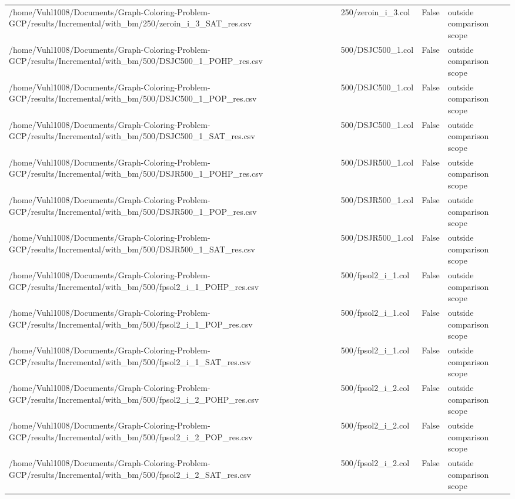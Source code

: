 \begin{table}[htbp]
\begin{tabular}{llll}
/home/Vuhl1008/Documents/Graph-Coloring-Problem-GCP/results/Incremental/with\_bm/250/zeroin\_i\_3\_SAT\_res.csv & 250/zeroin\_i\_3.col & False & outside comparison scope \\
/home/Vuhl1008/Documents/Graph-Coloring-Problem-GCP/results/Incremental/with\_bm/500/DSJC500\_1\_POHP\_res.csv & 500/DSJC500\_1.col & False & outside comparison scope \\
/home/Vuhl1008/Documents/Graph-Coloring-Problem-GCP/results/Incremental/with\_bm/500/DSJC500\_1\_POP\_res.csv & 500/DSJC500\_1.col & False & outside comparison scope \\
/home/Vuhl1008/Documents/Graph-Coloring-Problem-GCP/results/Incremental/with\_bm/500/DSJC500\_1\_SAT\_res.csv & 500/DSJC500\_1.col & False & outside comparison scope \\
/home/Vuhl1008/Documents/Graph-Coloring-Problem-GCP/results/Incremental/with\_bm/500/DSJR500\_1\_POHP\_res.csv & 500/DSJR500\_1.col & False & outside comparison scope \\
/home/Vuhl1008/Documents/Graph-Coloring-Problem-GCP/results/Incremental/with\_bm/500/DSJR500\_1\_POP\_res.csv & 500/DSJR500\_1.col & False & outside comparison scope \\
/home/Vuhl1008/Documents/Graph-Coloring-Problem-GCP/results/Incremental/with\_bm/500/DSJR500\_1\_SAT\_res.csv & 500/DSJR500\_1.col & False & outside comparison scope \\
/home/Vuhl1008/Documents/Graph-Coloring-Problem-GCP/results/Incremental/with\_bm/500/fpsol2\_i\_1\_POHP\_res.csv & 500/fpsol2\_i\_1.col & False & outside comparison scope \\
/home/Vuhl1008/Documents/Graph-Coloring-Problem-GCP/results/Incremental/with\_bm/500/fpsol2\_i\_1\_POP\_res.csv & 500/fpsol2\_i\_1.col & False & outside comparison scope \\
/home/Vuhl1008/Documents/Graph-Coloring-Problem-GCP/results/Incremental/with\_bm/500/fpsol2\_i\_1\_SAT\_res.csv & 500/fpsol2\_i\_1.col & False & outside comparison scope \\
/home/Vuhl1008/Documents/Graph-Coloring-Problem-GCP/results/Incremental/with\_bm/500/fpsol2\_i\_2\_POHP\_res.csv & 500/fpsol2\_i\_2.col & False & outside comparison scope \\
/home/Vuhl1008/Documents/Graph-Coloring-Problem-GCP/results/Incremental/with\_bm/500/fpsol2\_i\_2\_POP\_res.csv & 500/fpsol2\_i\_2.col & False & outside comparison scope \\
/home/Vuhl1008/Documents/Graph-Coloring-Problem-GCP/results/Incremental/with\_bm/500/fpsol2\_i\_2\_SAT\_res.csv & 500/fpsol2\_i\_2.col & False & outside comparison scope \\

\end{tabular}
\end{table}
